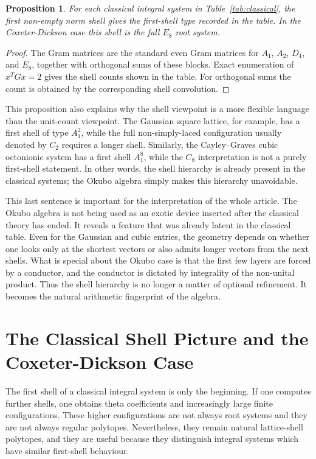 \documentclass{birkjour}
\newtheorem{proposition}[theorem]{Proposition}
\numberwithin{equation}{section}
\begin{document}
\begin{proposition}
For each classical integral system in Table~\ref{tab:classical}, the first
non-empty norm shell gives the first-shell type recorded in the table. In the
Coxeter-Dickson case this shell is the full \(E_8\) root system.
\end{proposition}

\begin{proof}
The Gram matrices are the standard even Gram matrices for \(A_1\), \(A_2\),
\(D_4\), and \(E_8\), together with orthogonal sums of these blocks. Exact
enumeration of \(x^TGx=2\) gives the shell counts shown in the table. For
orthogonal sums the count is obtained by the corresponding shell convolution.
\end{proof}

This proposition also explains why the shell viewpoint is a more flexible
language than the unit-count viewpoint. The Gaussian square lattice, for
example, has a first shell of type \(A_1^2\), while the full non-simply-laced
configuration usually denoted by \(C_2\) requires a longer shell. Similarly,
the Cayley--Graves cubic octonionic system has a first shell \(A_1^8\), while
the \(C_8\) interpretation is not a purely first-shell statement. In other
words, the shell hierarchy is already present in the classical systems; the
Okubo algebra simply makes this hierarchy unavoidable.

This last sentence is important for the interpretation of the whole article.
The Okubo algebra is not being used as an exotic device inserted after the
classical theory has ended. It reveals a feature that was already latent in the
classical table. Even for the Gaussian and cubic entries, the geometry depends
on whether one looks only at the shortest vectors or also admits longer vectors
from the next shells. What is special about the Okubo case is that the first
few layers are forced by a conductor, and the conductor is dictated by
integrality of the non-unital product. Thus the shell hierarchy is no longer a
matter of optional refinement. It becomes the natural arithmetic fingerprint of
the algebra.

\section{The Classical Shell Picture and the Coxeter-Dickson Case}

The first shell of a classical integral system is only the beginning. If one
computes further shells, one obtains theta coefficients and increasingly large
finite configurations. These higher configurations are not always root systems
and they are not always regular polytopes. Nevertheless, they remain natural
lattice-shell polytopes, and they are useful because they distinguish integral
systems which have similar first-shell behaviour.
\end{document}
